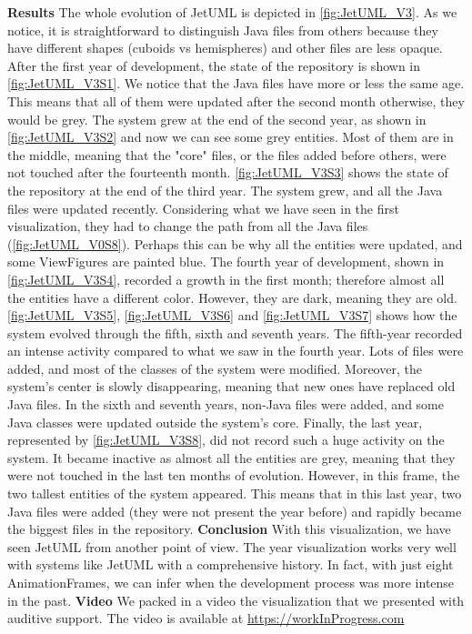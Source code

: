 \textbf{Results}
The whole evolution of JetUML is depicted in \autoref{fig:JetUML_V3}. As we notice, it is straightforward to distinguish Java files from others because they have different shapes (cuboids vs hemispheres)  and other files are less opaque. After the first year of development, the state of the repository is shown in \autoref{fig:JetUML_V3S1}. We notice that the Java files have more or less the same age. This means that all of them were updated after the second month otherwise, they would be grey. The system grew at the end of the second year, as shown in \autoref{fig:JetUML_V3S2} and now we can see some grey entities. Most of them are in the middle, meaning that the "core" files, or the files added before others, were not touched after the fourteenth month.  \autoref{fig:JetUML_V3S3} shows the state of the repository at the end of the third year. The system grew, and all the Java files were updated recently. Considering what we have seen in the first visualization, they had to change the path from all the Java files (\autoref{fig:JetUML_V0S8}). Perhaps this can be why all the entities were updated, and some ViewFigures are painted blue. 
The fourth year of development, shown in  \autoref{fig:JetUML_V3S4}, recorded a growth in the first month; therefore almost all the entities have a different color.
However, they are dark, meaning they are old. 
\autoref{fig:JetUML_V3S5},  \autoref{fig:JetUML_V3S6} and  \autoref{fig:JetUML_V3S7} shows how the system evolved through the fifth, sixth and seventh years. The fifth-year recorded an intense activity compared to what we saw in the fourth year. Lots of files were added, and most of the classes of the system were modified. Moreover, the system's center is slowly disappearing, meaning that new ones have replaced old Java files. In the sixth and seventh years, non-Java files were added, and some Java classes were updated outside the system's core. Finally, the last year, represented by \autoref{fig:JetUML_V3S8}, did not record such a huge activity on the system. It became inactive as almost all the entities are grey, meaning that they were not touched in the last ten months of evolution. However, in this frame, the two tallest entities of the system appeared. This means that in this last year, two Java files were added (they were not present the year before) and rapidly became the biggest files in the repository.  
\bigbreak
\textbf{Conclusion}
With this visualization, we have seen JetUML from another point of view. The year visualization works very well with systems like JetUML with a comprehensive history. In fact, with just eight AnimationFrames, we can infer when the development process was more intense in the past. 
\bigbreak
\textbf{Video}
We packed in a video the visualization that we presented with auditive support. The video is available at \url{https://workInProgress.com}

